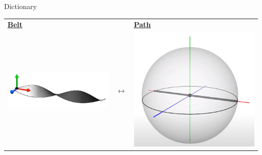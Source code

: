 \documentclass[10pt]{beamer}
\begin{document}
\begin{frame}{Dictionary}
    \begin{center}
    \begin{tabular}{m{3cm} m{2cm} m{3cm}}
        \textbf{\underline{Belt}} & & \textbf{\underline{Path}} \\
        \includegraphics[scale=0.15]{Pictures/xaxisbelt.png} & $\longleftrightarrow$ & \includegraphics[scale=0.1]{Pictures/xaxissphere.png} \\

\end{tabular}
\end{center}
\end{frame}
\end{document}

